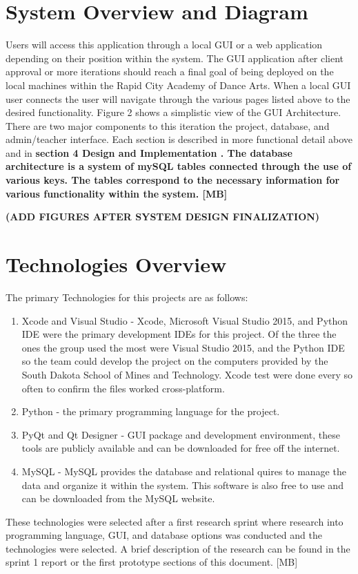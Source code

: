 \section{System Overview and Diagram}
\textmd{Users will access this application through a local GUI or a web application depending on their position within the system. The GUI application after client approval or more iterations should reach a final goal of being deployed on the local machines within the Rapid City Academy of Dance Arts. 
When a local GUI user connects the user will navigate through the various pages listed above to the desired functionality. Figure 2 shows a simplistic view of the GUI Architecture.
There are two major components to this iteration the project, database, and admin/teacher interface.  Each section is described in more functional detail above and in} \bf section 4 Design and Implementation \rm.
The database architecture is a system of mySQL tables connected through the use of various keys. The tables correspond to the necessary information for various functionality within the system. [MB]


\bf(ADD FIGURES AFTER SYSTEM DESIGN FINALIZATION)


\section{Technologies Overview}
\textmd{The primary Technologies for this projects are as follows:}

\begin{enumerate}
\item Xcode and Visual Studio - Xcode, Microsoft Visual Studio 2015, and Python IDE were the primary development IDEs for this project. Of the three the ones the group used the most were Visual Studio 2015, and the Python IDE so the team could develop the project on the computers provided by the South Dakota School of Mines and Technology. Xcode test were done every so often to confirm the files worked cross-platform.
\item Python - the primary programming language for the project.
\item PyQt and Qt Designer - GUI package and development environment, these tools are publicly available and can be downloaded for free off the internet. 
\item MySQL - MySQL provides the database and relational quires to manage the data and organize it within the system. This software is also free to use and can be downloaded from the MySQL website.
\end{enumerate}


\textmd{These technologies were selected after a first research sprint where research into programming language, GUI, and database options was conducted and the technologies were selected. A brief description of the research can be found in the sprint 1 report or the first prototype sections of this document. [MB]}

